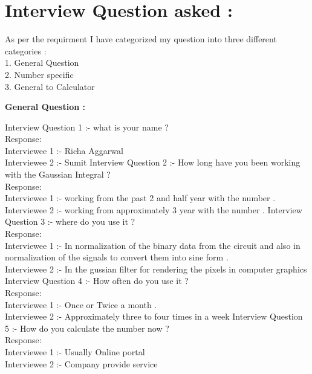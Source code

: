 \documentclass{article}
\begin{document}
\section*{\textbf{ Interview Question asked :}}
\begin{flushleft}
\hrulefill
\end{flushleft}
\noindent As per the requirment I have categorized my question into three different categories : 
\\ 1. General Question 
\\ 2. Number specific 
\\ 3. General to Calculator \newline \newline \newline \newline
\begin{center}
   \textbf{ General Question :}    
\end{center}
\begin{flushleft}
\hrulefill
\end{flushleft}
\noindent Interview Question 1 :- what is your name ?
\\Response:
\\  Interviewee 1 :- Richa Aggarwal
\\  Interviewee 2 :- Sumit  \newline \newline
\noindent Interview Question 2 :- How long have you been working with the Gaussian Integral  ?
\\Response:
\\  Interviewee 1 :- working from the past 2 and half year with the number .
\\  Interviewee 2 :- working from approximately 3 year with the number . \newline \newline
\noindent Interview Question 3 :- where do you use it ?
\\Response:
\\  Interviewee 1 :- In normalization of the binary data from the circuit and also in normalization of the signals to convert them into sine form .
\\  Interviewee 2 :- In the gussian filter for rendering the pixels in computer graphics \newline \newline
\noindent Interview Question 4 :- How often do you use it ?
\\Response:
\\  Interviewee 1 :- Once or Twice a month . 
\\  Interviewee 2 :- Approximately three to four times in a week  \newline \newline
\noindent Interview Question 5 :- How do you calculate the number  now ?
\\Response:
\\  Interviewee 1 :- Usually Online portal
\\  Interviewee 2 :- Company provide service  \newline \newline \newline
\end{document}
